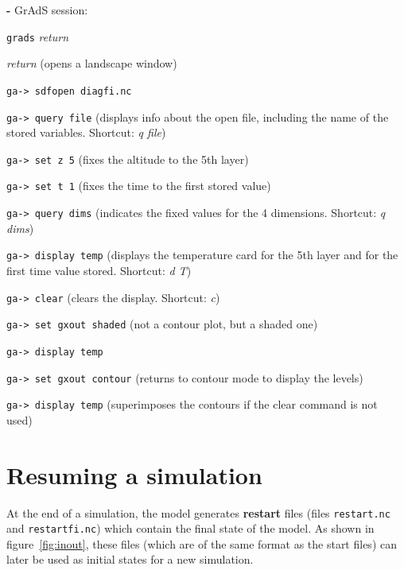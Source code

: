\begin{description}
\item {\bf -} GrAdS session:

  \begin{description}
  \item \verb+grads+ {\it return}

  \item {\it return} (opens a landscape window)

  \item \verb+ga-> sdfopen diagfi.nc+ 

  \item \verb+ga-> query file+ (displays info about the open file, including the name of the stored variables. Shortcut: {\it q file})

  \item \verb+ga-> set z 5+ (fixes the altitude to the 5th layer)

  \item \verb+ga-> set t 1+ (fixes the time to the first stored value)

  \item \verb+ga-> query dims+ (indicates the fixed values for the 4
  dimensions. Shortcut: {\it q dims})

  \item \verb+ga-> display temp+ (displays the temperature card for the 5th layer and for the first time value stored. Shortcut: {\it d
  T})

  \item \verb+ga-> clear+ (clears the display. Shortcut: {\it c})

  \item \verb+ga-> set gxout shaded+ (not a contour plot, but a shaded one)

  \item \verb+ga-> display temp+ 

  \item \verb+ga-> set gxout contour+ (returns to contour mode to display the levels)

  \item \verb+ga-> display temp+ (superimposes the contours if the clear command is not used)

  \end{description}
\end{description}




\section{Resuming a simulation}
At the end of a simulation, the model generates {\bf restart} files
(files {\tt restart.nc} and {\tt restartfi.nc})
which contain the final state of the model.
As shown in figure~\ref{fig:inout},
these files (which are of the same format as the start files)
can later be used as initial
states for a new simulation.\\

